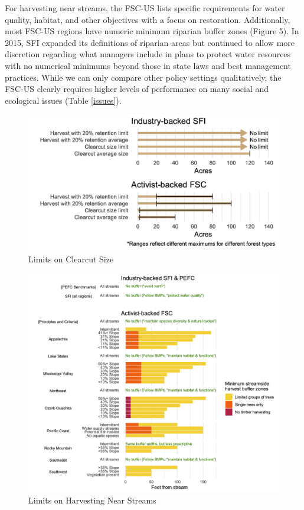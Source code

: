 \documentclass[
      12pt,
            Review ]{article}
\begin{document}
For harvesting near streams, the FSC-US lists specific requirements for
water quality, habitat, and other objectives with a focus on
restoration. Additionally, most FSC-US regions have numeric minimum
riparian buffer zones (Figure 5). In 2015, SFI expanded its definitions
of riparian areas but continued to allow more discretion regarding what
managers include in plans to protect water resources with no numerical
minimums beyond those in state laws and best management practices. While
we can only compare other policy settings qualitatively, the FSC-US
clearly requires higher levels of performance on many social and
ecological issues (Table \ref{issues}).

\begin{figure}
\centering
\includegraphics{clearcuts-1.png}
\caption{Limits on Clearcut Size\label{clearcuts}}
\end{figure}

\begin{figure}
\centering
\includegraphics{riparian-1.png}
\caption{Limits on Harvesting Near Streams\label{riparian}}
\end{figure}
\end{document}
